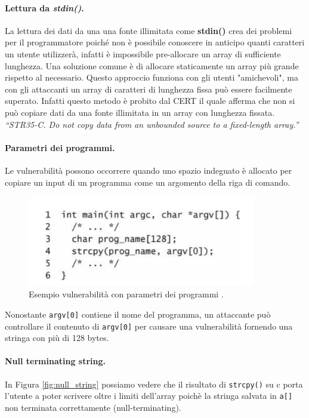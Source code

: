 \paragraph{Lettura da \textit{stdin()}.} La lettura dei dati da una una fonte illimitata come \textbf{stdin()} crea dei problemi per il programmatore poiché non è possibile conoscere in anticipo quanti caratteri un utente utilizzerà, infatti è impossibile pre-allocare un array di sufficiente lunghezza. Una soluzione comune è di allocare staticamente un array più grande rispetto al necessario. Questo approccio funziona con gli utenti "amichevoli", ma con gli attaccanti un array di caratteri di lunghezza fissa può essere facilmente superato. Infatti questo metodo è probito dal CERT il quale afferma che non si può copiare dati da una fonte illimitata in un array con lunghezza fissata.\\
\textit{“STR35-C. Do not copy data from an unbounded
    source to a fixed-length array.”}
\paragraph{Parametri dei programmi.} Le vulnerabilità possono occorrere quando uno spazio indeguato è allocato per copiare un input di un programma come un argomento della riga di comando.

\begin{figure}[H]
    \centering
    \includegraphics[width=10cm, keepaspectratio]{capitoli/secure_coding/img/cap_2/parametri_funzioni.png}
    \caption{Esempio vulnerabilità con parametri dei programmi .}\label{fig:parametri_programmi}
\end{figure}
Nonostante \verb|argv[0]| contiene il nome del programma, un attaccante può controllare il contenuto di \verb|argv[0]| per causare una vulnerabilità fornendo una stringa con più di 128 bytes.

\paragraph{Null terminating string.}
In Figura \ref{fig:null_string} possiamo vedere che il risultato di \verb|strcpy()| su c porta l'utente a poter scrivere oltre i limiti dell'array poichè la stringa salvata in \verb|a[]| non terminata correttamente (null-terminating).


